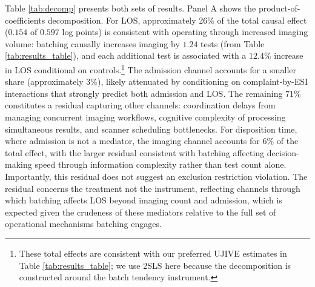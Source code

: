 \documentclass[,,blindrev]{informs}
\begin{document}
Table \ref{tab:decomp} presents both sets of results. Panel A shows the
product-of-coefficients decomposition. For LOS, approximately 26\% of
the total causal effect (\(0.154\) of \(0.597\) log points) is
consistent with operating through increased imaging volume: batching
causally increases imaging by \(1.24\) tests (from Table
\ref{tab:results_table}), and each additional test is associated with a
\(12.4\%\) increase in LOS conditional on
controls.\footnote{These total effects are consistent with our preferred UJIVE estimates in Table \ref{tab:results_table}; we use 2SLS here because the decomposition is constructed around the batch tendency instrument.}
The admission channel accounts for a smaller share (approximately 3\%),
likely attenuated by conditioning on complaint-by-ESI interactions that
strongly predict both admission and LOS. The remaining 71\% constitutes
a residual capturing other channels: coordination delays from managing
concurrent imaging workflows, cognitive complexity of processing
simultaneous results, and scanner scheduling bottlenecks. For
disposition time, where admission is not a mediator, the imaging channel
accounts for 6\% of the total effect, with the larger residual
consistent with batching affecting decision-making speed through
information complexity rather than test count alone. Importantly, this
residual does not suggest an exclusion restriction violation. The
residual concerns the treatment not the instrument, reflecting channels
through which batching affects LOS beyond imaging count and admission,
which is expected given the crudeness of these mediators relative to the
full set of operational mechanisms batching engages.
\end{document}
